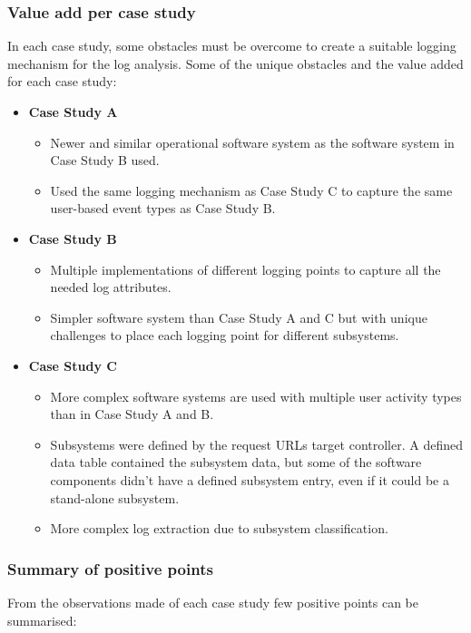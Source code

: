 \subsubsection{Value add per case study}
In each case study, some obstacles must be overcome to create a suitable logging mechanism for the log analysis. Some of the unique obstacles and the value added for each case study:

\begin{itemize}
	\item \textbf{Case Study A}
		\begin{itemize}
			\item Newer and similar operational software system as the software system in Case Study B used.
			\item Used the same logging mechanism as Case Study C to capture the same user-based event types as Case Study B.
		\end{itemize}
	\item \textbf{Case Study B}
	\begin{itemize}
		\item Multiple implementations of different logging points to capture all the needed log attributes.
		\item Simpler software system than Case Study A and C but with unique challenges to place each logging point for different subsystems.
	\end{itemize}
	\item \textbf{Case Study C}
	\begin{itemize}
		\item More complex software systems are used with multiple user activity types than in Case Study A and B.
		\item Subsystems were defined by the request URLs target controller. A defined data table contained the subsystem data, but some of the software components didn't have a defined subsystem entry, even if it could be a stand-alone subsystem.
		\item More complex log extraction due to subsystem classification.
	\end{itemize}
\end{itemize}

\subsubsection{Summary of positive points}
From the observations made of each case study few positive points can be summarised:

